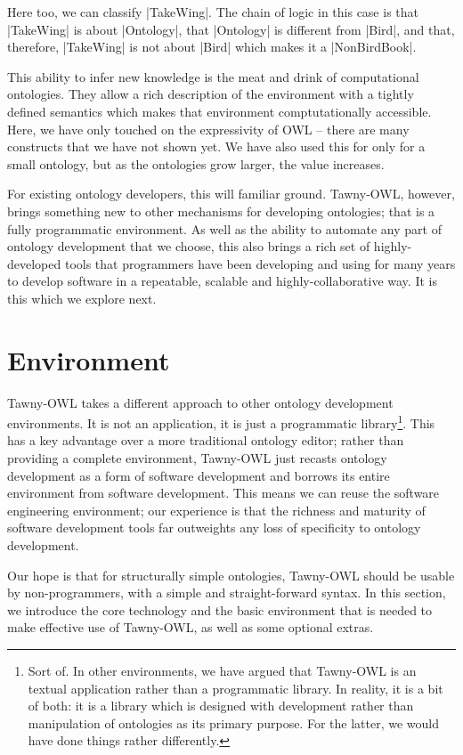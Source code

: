 Here too, we can classify |TakeWing|. The chain of logic in this case is that
|TakeWing| is about |Ontology|, that |Ontology| is different from |Bird|, and
that, therefore, |TakeWing| is not about |Bird| which makes it a |NonBirdBook|.

This ability to infer new knowledge is the meat and drink of computational
ontologies. They allow a rich description of the environment with a tightly
defined semantics which makes that environment comptutationally accessible.
Here, we have only touched on the expressivity of OWL -- there are many
constructs that we have not shown yet. We have also used this for only for a
small ontology, but as the ontologies grow larger, the value increases.

For existing ontology developers, this will familiar ground. Tawny-OWL,
however, brings something new to other mechanisms for developing ontologies;
that is a fully programmatic environment. As well as the ability to automate
any part of ontology development that we choose, this also brings a rich set
of highly-developed tools that programmers have been developing and using for
many years to develop software in a repeatable, scalable and
highly-collaborative way. It is this which we explore next.


\section{Environment}
\label{sec:environment}

Tawny-OWL takes a different approach to other ontology development
environments. It is not an application, it is just a programmatic
library\footnote{Sort of. In other environments, we have argued that Tawny-OWL
  is an textual application rather than a programmatic library. In reality, it
is a bit of both: it is a library which is designed with development rather
than manipulation of ontologies as its primary purpose. For the latter, we
would have done things rather differently.}. This has a
key advantage over a more traditional ontology editor; rather than providing
a complete environment, Tawny-OWL just recasts ontology development as a form
of software development and borrows its entire environment from software
development. This means we can reuse the software engineering environment; our
experience is that the richness and maturity of software development tools far
outweights any loss of specificity to ontology development.

Our hope is that for structurally simple ontologies, Tawny-OWL should be
usable by non-programmers, with a simple and straight-forward syntax. In this
section, we introduce the core technology and the basic environment that is
needed to make effective use of Tawny-OWL, as well as some optional extras.


